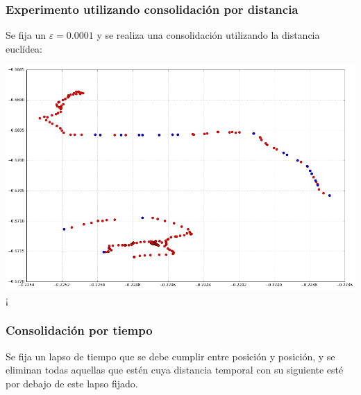 \documentclass[10pt, spanish]{beamer}
\begin{document}
\begin{frame}[fragile]
\frametitle{Experimento utilizando consolidaci\'on por distancia}
Se fija un $\varepsilon = 0.0001$ y se realiza una consolidaci\'on utilizando la distancia eucl\'idea:\\

\bigskip

\begin{center}
	\includegraphics[scale=.3]{distanceEuEps10-4.png}¡
\end{center}

\end{frame}

\begin{frame}[fragile]
\frametitle{Consolidaci\'on por tiempo}

Se fija un lapso de tiempo que se debe cumplir entre posici\'on y posici\'on, y se eliminan todas aquellas que est\'en cuya distancia temporal con su siguiente est\'e por debajo de este lapso fijado.\\

\bigskip
\begin{algorithmic}[1]
		\EndIf
	\EndFor
\EndFunction
\end{algorithmic}
\end{frame}
\end{document}
